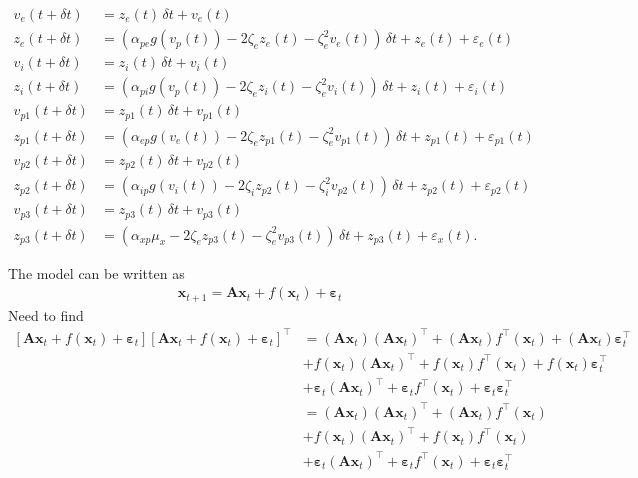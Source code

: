 \documentclass[]{article}
\begin{document}
\begin{align}
	v_e(t+\delta t) &= z_e(t)\,\delta t + v_e(t)\\
	z_e(t+\delta t) &= (\alpha_{pe}g\left(v_p(t)\right) - 2\zeta_{e}z_e(t) - \zeta_{e}^2v_e(t))\,\delta t + z_e(t) + \varepsilon_e(t) \\
	v_i(t+\delta t) &= z_i(t)\,\delta t + v_i(t)\\
	z_i(t+\delta t) &= \left(\alpha_{pi}g\left(v_p(t)\right) - 2\zeta_{e}z_i(t) - \zeta_{e}^2v_i(t)\right)\,\delta t + z_i(t) + \varepsilon_i(t)\\
	v_{p1}(t+\delta t) &= z_{p1}(t)\,\delta t + v_{p1}(t) \\
	z_{p1}(t+\delta t) &= (\alpha_{ep}g\left(v_e(t)\right) - 2\zeta_{e}z_{p1}(t) - \zeta_{e}^2v_{p1}(t))\,\delta t + z_{p1}(t) + \varepsilon_{p1}(t)\\
	v_{p2}(t+\delta t) &= z_{p2}(t)\,\delta t + v_{p2}(t) \\
	z_{p2}(t+\delta t) &= (\alpha_{ip}g\left(v_i(t)\right) - 2\zeta_{i}z_{p2}(t) - \zeta_{i}^2v_{p2}(t))\,\delta t + z_{p2}(t) + \varepsilon_{p2}(t) \\
	v_{p3}(t+\delta t) &= z_{p3}(t)\,\delta t + v_{p3}(t) \\
	z_{p3}(t+\delta t) &= (\alpha_{xp}\mu_x - 2\zeta_{e}z_{p3}(t) - \zeta_{e}^2v_{p3}(t))\,\delta t + z_{p3}(t) + \varepsilon_x(t).
\end{align}

The model can be written as
\begin{align}
	\mathbf{x}_{t+1} = \mathbf{A}\mathbf{x}_t + f(\mathbf{x}_t) + \boldsymbol{\varepsilon}_t
\end{align}
Need to find
\begin{align}
	\left[\mathbf{A}\mathbf{x}_t + f(\mathbf{x}_t) + \boldsymbol{\varepsilon}_t\right]\left[\mathbf{A}\mathbf{x}_t + f(\mathbf{x}_t) + \boldsymbol{\varepsilon}_t\right]^{\top} &= \left(\mathbf{A}\mathbf{x}_t\right)\left(\mathbf{A}\mathbf{x}_t\right)^{\top} + \left(\mathbf{A}\mathbf{x}_t\right)f^{\top}(\mathbf{x}_t) + \left(\mathbf{A}\mathbf{x}_t\right)\boldsymbol{\varepsilon}^{\top}_t \\
	&+ f(\mathbf{x}_t)\left(\mathbf{A}\mathbf{x}_t\right)^{\top} + f(\mathbf{x}_t)f^{\top}(\mathbf{x}_t) + f(\mathbf{x}_t)\boldsymbol{\varepsilon}^{\top}_t \\
	&+ \boldsymbol{\varepsilon}_t\left(\mathbf{A}\mathbf{x}_t\right)^{\top} + \boldsymbol{\varepsilon}_tf^{\top}(\mathbf{x}_t) + \boldsymbol{\varepsilon}_t\boldsymbol{\varepsilon}^{\top}_t \\
	&= \left(\mathbf{A}\mathbf{x}_t\right)\left(\mathbf{A}\mathbf{x}_t\right)^{\top} + \left(\mathbf{A}\mathbf{x}_t\right)f^{\top}(\mathbf{x}_t) \\
	&+ f(\mathbf{x}_t)\left(\mathbf{A}\mathbf{x}_t\right)^{\top} + f(\mathbf{x}_t)f^{\top}(\mathbf{x}_t) \\
	&+ \boldsymbol{\varepsilon}_t\left(\mathbf{A}\mathbf{x}_t\right)^{\top} + \boldsymbol{\varepsilon}_tf^{\top}(\mathbf{x}_t) + \boldsymbol{\varepsilon}_t\boldsymbol{\varepsilon}^{\top}_t
\end{align}


\end{document}
